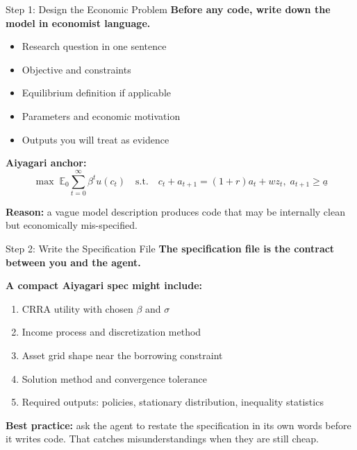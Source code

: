 \documentclass[10pt,english,aspectratio=169]{beamer}
\begin{document}
\begin{frame}{Step 1: Design the Economic Problem}
\textbf{Before any code, write down the model in economist language.}

\vspace{0.25cm}

\begin{itemize}
    \item Research question in one sentence
    \item Objective and constraints
    \item Equilibrium definition if applicable
    \item Parameters and economic motivation
    \item Outputs you will treat as evidence
\end{itemize}

\vspace{0.25cm}

\textbf{Aiyagari anchor:}
\[
\max \; \mathbb{E}_0 \sum_{t=0}^{\infty} \beta^t u(c_t)
\quad \text{s.t.} \quad
c_t + a_{t+1} = (1+r)a_t + wz_t,\; a_{t+1} \geq \underline{a}
\]

\vspace{0.15cm}

\textbf{Reason:} a vague model description produces code that may be internally clean but economically mis-specified.
\end{frame}

\begin{frame}{Step 2: Write the Specification File}
\textbf{The specification file is the contract between you and the agent.}

\vspace{0.2cm}

\textbf{A compact Aiyagari spec might include:}
\begin{enumerate}
    \item CRRA utility with chosen $\beta$ and $\sigma$
    \item Income process and discretization method
    \item Asset grid shape near the borrowing constraint
    \item Solution method and convergence tolerance
    \item Required outputs: policies, stationary distribution, inequality statistics
\end{enumerate}

\vspace{0.25cm}

\textbf{Best practice:} ask the agent to restate the specification in its own words before it writes code. That catches misunderstandings when they are still cheap.
\end{frame}
\end{document}
